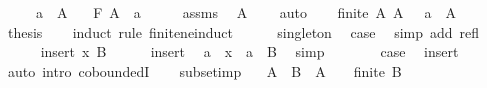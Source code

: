 \begin{isabellebody}
\ \ \ \ \ {\isachardoublequoteopen}a\ {\isasymin}\ A{\isachardoublequoteclose}\isanewline
\ \ \ {\isachardoublequoteopen}F\ A\ \isactrlbold {\isasymle}\ a{\isachardoublequoteclose}\isanewline
%
\isadelimproof
%
\endisadelimproof
%
\isatagproof
{}\isamarkupfalse%
\ {\isacharminus}{\kern0pt}\isanewline
\ \ \isamarkupfalse%
\ assms\ \isamarkupfalse%
\ {\isachardoublequoteopen}A\ {\isasymnoteq}\ {\isacharbraceleft}{\kern0pt}{\isacharbraceright}{\kern0pt}{\isachardoublequoteclose}\ \isamarkupfalse%
\ auto\isanewline
\ \ \isamarkupfalse%
\ {\isacartoucheopen}finite\ A{\isacartoucheclose}\ {\isacartoucheopen}A\ {\isasymnoteq}\ {\isacharbraceleft}{\kern0pt}{\isacharbraceright}{\kern0pt}{\isacartoucheclose}\ {\isacartoucheopen}a\ {\isasymin}\ A{\isacartoucheclose}\ \isamarkupfalse%
\ {\isacharquery}{\kern0pt}thesis\isanewline
\ \ \isamarkupfalse%
\ {\isacharparenleft}{\kern0pt}induct\ rule{\isacharcolon}{\kern0pt}\ finite{\isacharunderscore}{\kern0pt}ne{\isacharunderscore}{\kern0pt}induct{\isacharparenright}{\kern0pt}\isanewline
\ \ \ \ \isamarkupfalse%
\ singleton\ \isamarkupfalse%
\ {\isacharquery}{\kern0pt}case\ \isamarkupfalse%
\ {\isacharparenleft}{\kern0pt}simp\ add{\isacharcolon}{\kern0pt}\ refl{\isacharparenright}{\kern0pt}\isanewline
\ \ \isamarkupfalse%
\isanewline
\ \ \ \ \isamarkupfalse%
\ {\isacharparenleft}{\kern0pt}insert\ x\ B{\isacharparenright}{\kern0pt}\isanewline
\ \ \ \ \isamarkupfalse%
\ insert\ \isamarkupfalse%
\ {\isachardoublequoteopen}a\ {\isacharequal}{\kern0pt}\ x\ {\isasymor}\ a\ {\isasymin}\ B{\isachardoublequoteclose}\ \isamarkupfalse%
\ simp\isanewline
\ \ \ \ \isamarkupfalse%
\ \isamarkupfalse%
\ {\isacharquery}{\kern0pt}case\ \isamarkupfalse%
\ insert\ \isamarkupfalse%
\ {\isacharparenleft}{\kern0pt}auto\ intro{\isacharcolon}{\kern0pt}\ coboundedI{}{\isacharparenright}{\kern0pt}\isanewline
\ \ \isamarkupfalse%
\isanewline
{}\isamarkupfalse%
%
\endisatagproof
{\isafoldproof}%
%
\isadelimproof
\isanewline
%
\endisadelimproof
\isanewline
{}\isamarkupfalse%
\ subset{\isacharunderscore}{\kern0pt}imp{\isacharcolon}{\kern0pt}\isanewline
\ \ \ {\isachardoublequoteopen}A\ {\isasymsubseteq}\ B{\isachardoublequoteclose}\ \ {\isachardoublequoteopen}A\ {\isasymnoteq}\ {\isacharbraceleft}{\kern0pt}{\isacharbraceright}{\kern0pt}{\isachardoublequoteclose}\ \ {\isachardoublequoteopen}finite\ B{\isachardoublequoteclose}\isanewline

\end{isabellebody}

